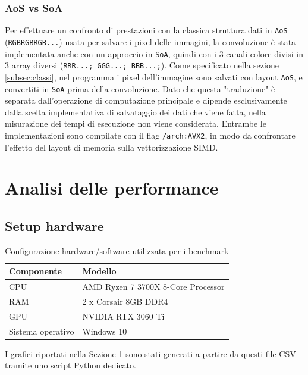 \documentclass{article}
\newcommand{\code}[1]{\texttt{#1}}
\begin{document}
\subsubsection{AoS vs SoA}
Per effettuare un confronto di prestazioni con la classica struttura dati in \code{AoS} (\code{RGBRGBRGB...}) usata per salvare i pixel delle immagini, la convoluzione è stata implementata anche con un approccio in \code{SoA}, quindi con i 3 canali colore divisi in 3 array diversi (\code{RRR...; GGG...; BBB...;}).
Come specificato nella sezione \ref{subsec:classi}, nel programma i pixel dell'immagine sono salvati con layout \code{AoS}, e convertiti in \code{SoA} prima della convoluzione. Dato che questa "traduzione" è separata dall'operazione di computazione principale e dipende esclusivamente dalla scelta implementativa di salvataggio dei dati che viene fatta, nella misurazione dei tempi di esecuzione non viene considerata.
Entrambe le implementazioni sono compilate con il flag \code{/arch:AVX2}, in modo da confrontare l'effetto del layout di memoria sulla vettorizzazione SIMD.

\section{Analisi delle performance}
\label{sec:performance}

\subsection{Setup hardware}
\renewcommand{\arraystretch}{1.4}
\begin{table}[H]
    \centering
    \begin{tabularx}{\textwidth}{ | l  X | }
        \hline
        \rowcolor{lightgray!70}
        \textbf{Componente} & \textbf{Modello} \\
        \hline
        CPU & AMD Ryzen 7 3700X 8-Core Processor\\
        \rowcolor{lightgray!40}
        RAM & 2 x Corsair 8GB DDR4\\
        GPU & NVIDIA RTX 3060 Ti\\
        \rowcolor{lightgray!40}
        Sistema operativo & Windows 10\\
        \hline
    \end{tabularx}
    \caption{Configurazione hardware/software utilizzata per i benchmark}
    \label{tab:hw_setup}
\end{table}


\noindent I grafici riportati nella Sezione \ref{sec:performance} sono stati generati a partire da questi file CSV tramite uno script Python dedicato.
\end{document}
